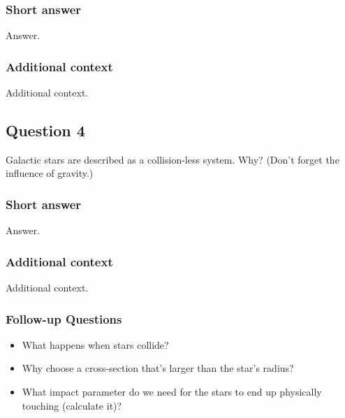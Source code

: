 \documentclass[a4paper,10pt]{article}
\begin{document}
\subsubsection{Short answer}

Answer.

\subsubsection{Additional context}

Additional context.


\newpage
\subsection{Question 4}

Galactic stars are described as a collision-less system. Why? (Don’t forget the influence of gravity.)

\subsubsection{Short answer}

Answer.

\subsubsection{Additional context}

Additional context.

\subsubsection{Follow-up Questions}

\begin{itemize}
    \item What happens when stars collide?
    \item Why choose a cross-section that's larger than the star's radius?
    \item What impact parameter do we need for the stars to end up physically touching (calculate it)?
\end{itemize}

\end{document}
